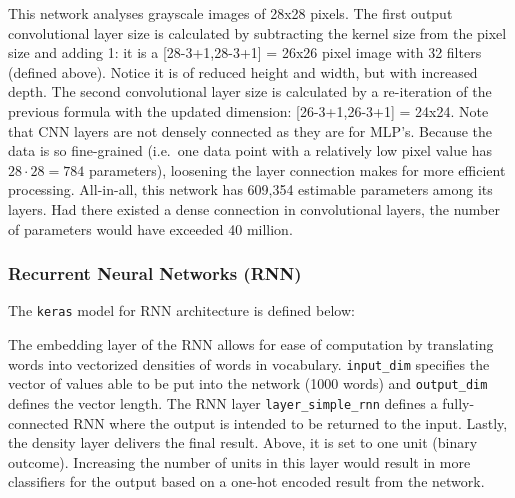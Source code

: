 This network analyses grayscale images of 28x28 pixels. The first output
convolutional layer size is calculated by subtracting the kernel size
from the pixel size and adding 1: it is a [28-3+1,28-3+1] = 
26x26 pixel image with 32 filters (defined above). Notice it is of
reduced height and width, but with increased depth. The second
convolutional layer size is calculated by a re-iteration of the previous
formula with the updated dimension: [26-3+1,26-3+1] =  24x24.
Note that CNN layers are not densely connected as they are for MLP's.
Because the data is so fine-grained (i.e.~one data point with a
relatively low pixel value has \(28 \cdot 28 = 784\) parameters),
loosening the layer connection makes for more efficient processing.
All-in-all, this network has 609,354 estimable parameters among its
layers. Had there existed a dense connection in convolutional layers,
the number of parameters would have exceeded 40 million.





\subsubsection{Recurrent Neural Networks
(RNN)}\label{recurrent-neural-networks-rnn}

The \texttt{keras} model for RNN architecture is defined below:

\begin{Shaded}
\begin{Highlighting}[]
\OtherTok{\textless{}{-}} \NormalTok{()}
\SpecialCharTok{\%\textgreater{}\%}
        \NormalTok{(} \NormalTok{, } \NormalTok{) }\SpecialCharTok{\%\textgreater{}\%}
        \NormalTok{(} \NormalTok{) }\SpecialCharTok{\%\textgreater{}\%}
        \NormalTok{(} \NormalTok{, } \NormalTok{)}
\end{Highlighting}
\end{Shaded}

The embedding layer of the RNN allows for ease of computation by
translating words into vectorized densities of words in vocabulary.
\texttt{input\_dim} specifies the vector of values able to be put into
the network (1000 words) and \texttt{output\_dim} defines the vector
length. The RNN layer \texttt{layer\_simple\_rnn} defines a
fully-connected RNN where the output is intended to be returned to the
input. Lastly, the density layer delivers the final result. Above, it is
set to one unit (binary outcome). Increasing the number of units in this
layer would result in more classifiers for the output based on a one-hot
encoded result from the network.